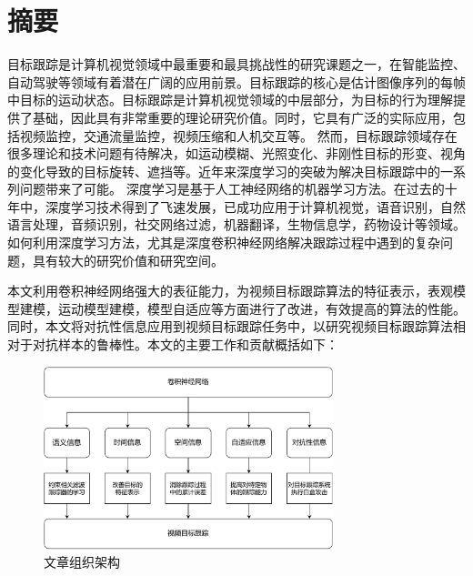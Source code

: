 \maketitle%
\MAKETITLE%
\makedeclaration%
\intobmk\chapter*{摘\quad 要}%
\setcounter{page}{1}%

目标跟踪是计算机视觉领域中最重要和最具挑战性的研究课题之一，在智能监控、自动驾驶等领域有着潜在广阔的应用前景。目标跟踪的核心是估计图像序列的每帧中目标的运动状态。目标跟踪是计算机视觉领域的中层部分，为目标的行为理解提供了基础，因此具有非常重要的理论研究价值。同时，它具有广泛的实际应用，包括视频监控，交通流量监控，视频压缩和人机交互等。
然而，目标跟踪领域存在很多理论和技术问题有待解决，如运动模糊、光照变化、非刚性目标的形变、视角的变化导致的目标旋转、遮挡等。近年来深度学习的突破为解决目标跟踪中的一系列问题带来了可能。
深度学习是基于人工神经网络的机器学习方法。在过去的十年中，深度学习技术得到了飞速发展，已成功应用于计算机视觉，语音识别，自然语言处理，音频识别，社交网络过滤，机器翻译，生物信息学，药物设计等领域。如何利用深度学习方法，尤其是深度卷积神经网络解决跟踪过程中遇到的复杂问题，具有较大的研究价值和研究空间。

本文利用卷积神经网络强大的表征能力，为视频目标跟踪算法的特征表示，表观模型建模，运动模型建模，模型自适应等方面进行了改进，有效提高的算法的性能。同时，本文将对抗性信息应用到视频目标跟踪任务中，以研究视频目标跟踪算法相对于对抗样本的鲁棒性。本文的主要工作和贡献概括如下：

\begin{figure}
\centering
\includegraphics[width=0.75\textwidth]{Img/paper_arch.pdf}
\caption{文章组织架构}
\end{figure}

